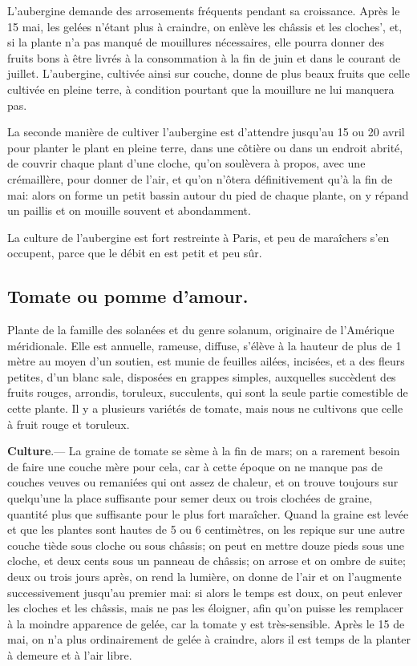 \documentclass[10pt,a4paper]{book}
\begin{document}
L'aubergine demande des arrosements fréquents pendant sa croissance. Après le 15 mai, les gelées n'étant plus à craindre, on enlève les châssis et les cloches', et, si la plante n'a pas manqué de mouillures nécessaires, elle pourra donner des fruits bons à être livrés à la consommation à la fin de juin et dans le courant de juillet. L'aubergine, cultivée ainsi sur couche, donne de plus beaux fruits que celle cultivée en pleine terre, à condition pourtant que la mouillure ne lui manquera pas.

La seconde manière de cultiver l'aubergine est d'attendre jusqu'au 15 ou 20 avril pour planter le plant en pleine terre, dans une côtière ou dans un endroit abrité, de couvrir chaque plant d'une cloche, qu'on soulèvera à propos, avec une crémaillère, pour donner de l'air, et qu'on n'ôtera définitivement qu'à la fin de mai: alors on forme un petit bassin autour du pied de chaque plante, on y répand un paillis et on mouille souvent et abondamment.

La culture de l'aubergine est fort restreinte à Paris, et peu de maraîchers s'en occupent, parce que le débit en est petit et peu sûr.

\subsection{Tomate ou pomme d'amour.}

Plante de la famille des solanées et du genre solanum, originaire de l'Amérique méridionale. Elle est annuelle, rameuse, diffuse, s'élève à la hauteur de plus de 1 mètre au moyen d'un soutien, est munie de feuilles ailées, incisées, et a des fleurs petites, d'un blanc sale, disposées en grappes simples, auxquelles succèdent des fruits rouges, arrondis, toruleux, succulents, qui sont la seule partie comestible de cette plante. Il y a plusieurs variétés de tomate, mais nous ne cultivons que celle à fruit rouge et toruleux.

\textbf{Culture}.--- La graine de tomate se sème à la fin de mars; on a rarement besoin de faire une couche mère pour cela, car à cette époque on ne manque pas de couches veuves ou remaniées qui ont assez de chaleur, et on trouve toujours sur quelqu'une la place suffisante pour semer deux ou trois clochées de graine, quantité plus que suffisante pour le plus fort maraîcher. Quand la graine est levée et que les plantes sont hautes de 5 ou 6 centimètres, on les repique sur une autre couche tiède sous cloche ou sous châssis; on peut en mettre douze pieds sous une cloche, et deux cents sous un panneau de châssis; on arrose et on ombre de suite; deux ou trois jours après, on rend la lumière, on donne de l'air et on l'augmente successivement jusqu'au premier mai: si alors le temps est doux, on peut enlever les cloches et les châssis, mais ne pas les éloigner, afin qu'on puisse les remplacer à la moindre apparence de gelée, car la tomate y est très-sensible. Après le 15 de mai, on n'a plus ordinairement de gelée à craindre, alors il est temps de la planter à demeure et à l'air libre.
\end{document}
